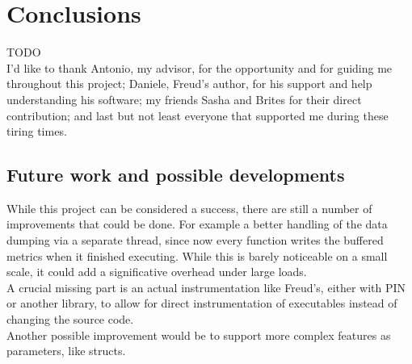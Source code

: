 \chapter{Conclusions}


    TODO\\

    I'd like to thank Antonio, my advisor, for the opportunity and for guiding me throughout
    this project; Daniele, Freud's author, for his support and help
    understanding his software; my friends Sasha and Brites for their direct contribution;
    and last but not least everyone that supported me during these tiring times.


	\section{Future work and possible developments}

        While this project can be considered a success, there are still a number of improvements
        that could be done. For example a better handling of the data dumping via a separate thread,
        since now every function writes the buffered metrics when it finished executing. While this
        is barely noticeable on a small scale, it could add a significative overhead under large loads.\\

        A crucial missing part is an actual instrumentation like Freud's, either with PIN or another
        library, to allow for direct instrumentation of executables instead of changing the source code.\\

        Another possible improvement would be to support more complex features as parameters, like structs.
